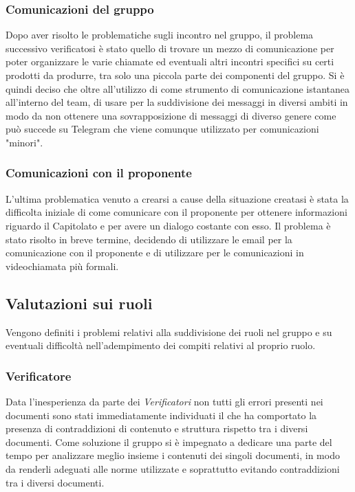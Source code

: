 \documentclass[../piano-di-qualifica.tex]{subfiles}
\begin{document}
\subsubsection{Comunicazioni del gruppo}
\label{sub:comunicazione_del_gruppo}
Dopo aver risolto le problematiche sugli incontro nel gruppo, il problema successivo verificatosi è stato quello di trovare un mezzo di comunicazione per poter organizzare le varie chiamate ed eventuali altri incontri specifici su certi prodotti da produrre, tra solo una piccola parte dei componenti del gruppo.
Si è quindi deciso che oltre all'utilizzo di  come strumento di comunicazione istantanea all'interno del team, di usare  per la suddivisione dei messaggi in diversi ambiti in modo da non ottenere una sovrapposizione di messaggi di diverso genere come può succede su Telegram che viene comunque utilizzato per comunicazioni "minori".

\subsubsection{Comunicazioni con il proponente}
\label{sub:comunicazione_con_il_proponente}
L'ultima problematica venuto a crearsi a cause della situazione creatasi è stata la difficolta iniziale di come comunicare con il proponente per ottenere informazioni riguardo il Capitolato e per avere un dialogo costante con esso.
Il problema è stato risolto in breve termine, decidendo di utilizzare le email per la comunicazione con il proponente e di utilizzare  per le comunicazioni in videochiamata più formali.

\subsection{Valutazioni sui ruoli}
\label{sub:valutazioni_ruoli}
Vengono definiti i problemi relativi alla suddivisione dei ruoli nel gruppo e su eventuali difficoltà nell'adempimento dei compiti relativi al proprio ruolo.
\subsubsection{Verificatore}
\label{sub:verificatore}
Data l'inesperienza da parte dei \textit{Verificatori} non tutti gli errori presenti nei documenti sono stati immediatamente individuati il che ha comportato la presenza di contraddizioni di contenuto e struttura rispetto tra i diversi documenti.
Come soluzione il gruppo si è impegnato a dedicare una parte del tempo per analizzare meglio insieme i contenuti dei singoli documenti, in modo da renderli adeguati alle norme utilizzate e soprattutto evitando contraddizioni tra i diversi documenti.
\end{document}
